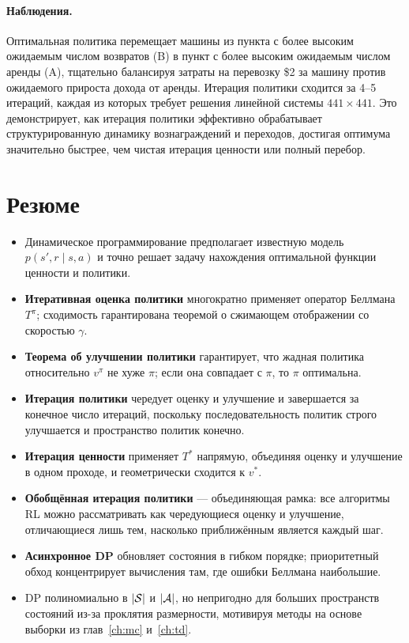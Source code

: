 \paragraph{Наблюдения.}
Оптимальная политика перемещает машины из пункта с более высоким ожидаемым числом возвратов (B) в пункт с более высоким ожидаемым числом аренды (A), тщательно балансируя затраты на перевозку \$2 за машину против ожидаемого прироста дохода от аренды.  Итерация политики сходится за 4--5 итераций, каждая из которых требует решения линейной системы $441 \times 441$.  Это демонстрирует, как итерация политики эффективно обрабатывает структурированную динамику вознаграждений и переходов, достигая оптимума значительно быстрее, чем чистая итерация ценности или полный перебор.

\section{Резюме}
\label{sec:dp-summary}

\begin{itemize}[leftmargin=*]
\item Динамическое программирование предполагает известную модель $p(s',r \mid s,a)$ и точно решает задачу нахождения оптимальной функции ценности и политики.
\item \textbf{Итеративная оценка политики} многократно применяет оператор Беллмана $T^\pi$; сходимость гарантирована теоремой о сжимающем отображении со скоростью $\gamma$.
\item \textbf{Теорема об улучшении политики} гарантирует, что жадная политика относительно $v^\pi$ не хуже $\pi$; если она совпадает с $\pi$, то $\pi$ оптимальна.
\item \textbf{Итерация политики} чередует оценку и улучшение и завершается за конечное число итераций, поскольку последовательность политик строго улучшается и пространство политик конечно.
\item \textbf{Итерация ценности} применяет $T^*$ напрямую, объединяя оценку и улучшение в одном проходе, и геометрически сходится к $v^*$.
\item \textbf{Обобщённая итерация политики} — объединяющая рамка: все алгоритмы RL можно рассматривать как чередующиеся оценку и улучшение, отличающиеся лишь тем, насколько приближённым является каждый шаг.
\item \textbf{Асинхронное DP} обновляет состояния в гибком порядке; приоритетный обход концентрирует вычисления там, где ошибки Беллмана наибольшие.
\item DP полиномиально в $|\mathcal{S}|$ и $|\mathcal{A}|$, но непригодно для больших пространств состояний из-за проклятия размерности, мотивируя методы на основе выборки из глав~\ref{ch:mc} и~\ref{ch:td}.
\end{itemize}


